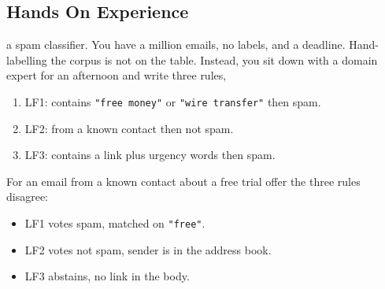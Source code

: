 \subsection{Hands On Experience}

\begin{marginfigure}
\caption{Three labelling functions voting on a batch of examples. They disagree, and they cover different examples. The label model has to infer who to trust on which.}
\label{fig:lf_votes}
\end{marginfigure}

 a spam classifier. You have a million emails, no labels, and a deadline. Hand-labelling the corpus is not on the table. Instead, you sit down with a domain expert for an afternoon and write three rules,
\begin{enumerate}
    \item LF1: contains \verb|"free money"| or \verb|"wire transfer"| then spam.
    \item LF2: from a known contact then not spam.
    \item LF3: contains a link plus urgency words then spam.
\end{enumerate}

For an email from a known contact about a free trial offer the three rules disagree:
\begin{itemize}
    \item LF1 votes spam, matched on \verb|"free"|.
    \item LF2 votes not spam, sender is in the address book.
    \item LF3 abstains, no link in the body.
\end{itemize}

